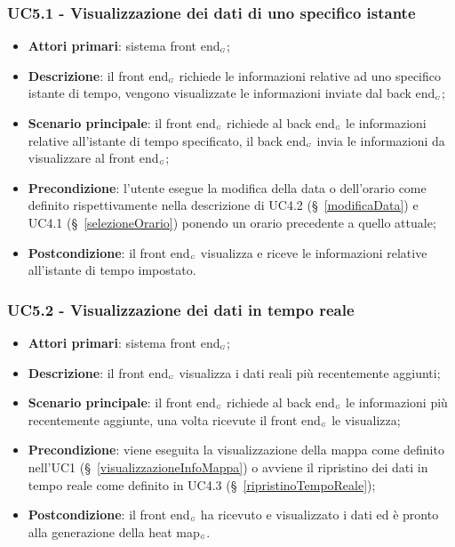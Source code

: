\subsubsection{UC5.1 - Visualizzazione dei dati di uno specifico istante}\label{richiestaDatiGiorno}
\begin{itemize}
	\item \textbf{Attori primari}: sistema front end$_{\scaleto{G}{3pt}}$;
	\item \textbf{Descrizione}: il front end$_{\scaleto{G}{3pt}}$ richiede le informazioni relative ad uno specifico istante di tempo, vengono visualizzate le informazioni inviate dal back end$_{\scaleto{G}{3pt}}$;
	\item \textbf{Scenario principale}:  il front end$_{\scaleto{G}{3pt}}$ richiede al back end$_{\scaleto{G}{3pt}}$ le informazioni relative all'istante di tempo specificato, il back end$_{\scaleto{G}{3pt}}$ invia le informazioni da visualizzare al front end$_{\scaleto{G}{3pt}}$;
	\item \textbf{Precondizione}: l’utente esegue la modifica della data o dell’orario come definito rispettivamente nella descrizione di UC4.2 (\S~\ref{modificaData}) e UC4.1 (\S~\ref{selezioneOrario}) ponendo un orario precedente a quello attuale;
	\item \textbf{Postcondizione}: il front end$_{\scaleto{G}{3pt}}$ visualizza e riceve le informazioni relative all'istante di tempo impostato. 
\end{itemize}

\subsubsection{UC5.2 - Visualizzazione dei dati in tempo reale}\label{richiestaDatiTempoReale}
\begin{itemize}
	\item \textbf{Attori primari}: sistema front end$_{\scaleto{G}{3pt}}$;
	\item \textbf{Descrizione}: il front end$_{\scaleto{G}{3pt}}$ visualizza i dati reali più recentemente aggiunti;
	\item \textbf{Scenario principale}: il front end$_{\scaleto{G}{3pt}}$ richiede al back end$_{\scaleto{G}{3pt}}$ le informazioni più recentemente aggiunte, una volta ricevute il front end$_{\scaleto{G}{3pt}}$ le visualizza;
	\item \textbf{Precondizione}: viene eseguita la visualizzazione della mappa come definito nell’UC1 (\S~\ref{visualizzazioneInfoMappa}) o avviene il ripristino dei dati in tempo reale come definito in UC4.3 (\S~\ref{ripristinoTempoReale});
	\item \textbf{Postcondizione}: il front end$_{\scaleto{G}{3pt}}$ ha ricevuto e visualizzato i dati ed è pronto alla generazione della heat map$_{\scaleto{G}{3pt}}$. 
\end{itemize}

